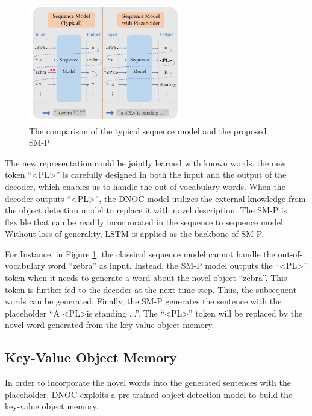 \documentclass[a4paper, 11pt]{article} %
\begin{document}
\begin{figure}[H]
	\centering
	\includegraphics[width=0.6\textwidth]{./img/sm-p.jpg}
	\caption{The comparison of the typical sequence model and the proposed SM-P}
	\label{fig:sm-p}
\end{figure}

The new representation could be jointly learned with known words. the new token
``\textless PL\textgreater'' is carefully designed in both the input and the output of the
decoder, which enables us to handle the out-of-vocabulary words. When the decoder outputs
``\textless PL\textgreater'', the DNOC model utilizes the external knowledge from the object
detection model to replace it with novel description. The SM-P is flexible that can be
readily incorporated in the sequence to sequence model. Without loss of generality, LSTM
is applied as the backbone of SM-P.

For Instance, in Figure \ref{fig:sm-p}, the classical sequence model cannot handle the
out-of-vocabulary word ``zebra'' as input. Instead, the SM-P model outputs the
``\textless PL\textgreater'' token when it needs to generate a word about the novel object
``zebra''. This token is further fed to the decoder at the next time step. Thus, the
subsequent words can be generated. Finally, the SM-P generates the sentence with the
placeholder ``A \textless PL\textgreater is standing ...''. The ``\textless PL\textgreater''
token will be replaced by the novel word generated from the key-value object memory.

\subsection{\textbf{Key-Value Object Memory}}

In order to incorporate the novel words into the generated sentences with the placeholder,
DNOC exploits a pre-trained object detection model to build the key-value object memory.
\end{document}
